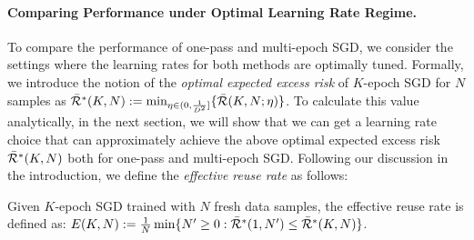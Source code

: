 \paragraph{Comparing Performance under Optimal Learning Rate Regime.} %
To compare the performance of one-pass and multi-epoch SGD, we consider the settings where the learning rates for both methods are optimally tuned.
Formally, we introduce the notion of the \textit{optimal expected excess risk} of $K$-epoch SGD for $N$ samples as $\bar{\mathcal{R}}^*(K, N):=\min_{\eta \in (0, \frac{1}{D^2}]}\{ \bar{\mathcal{R}}(K, N; \eta) \}$. To calculate this value analytically, in the next section, we will show that we can get a learning rate choice that can approximately achieve the above optimal expected excess risk $\bar{\mathcal{R}}^*(K, N)$ both for one-pass and multi-epoch SGD.
Following our discussion in the introduction, we define the \textit{effective reuse rate} as follows:
\begin{definition}\label{def:E_K}
Given $K$-epoch SGD trained with $N$ fresh data samples, the effective reuse rate is defined as: $E(K,N) := \frac{1}{N}\min\{N' \ge 0: \bar{\mathcal{R}}^*(1, N') \leq\bar{\mathcal{R}}^*(K, N)\}$.
\end{definition}

